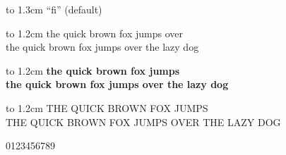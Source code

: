 \documentclass[10pt]{article}
\begin{document}
\vbox to 1.3cm{ %
{\LARGE ``fi''} (default)\\
\selectfont {\LARGE ``fi''} %
}

\vbox to 1.2cm{
the quick brown fox jumps over\\
\selectfont the quick brown fox jumps over the lazy dog
}

\vbox to 1.2cm{
\bfseries the quick brown fox jumps\\
\selectfont \bfseries the quick brown fox jumps over the lazy dog
}

\vbox to 1.2cm{
THE QUICK BROWN FOX JUMPS\\
\selectfont THE QUICK BROWN FOX JUMPS OVER THE LAZY DOG
}

\vbox{
0123456789 
}
\end{document}
